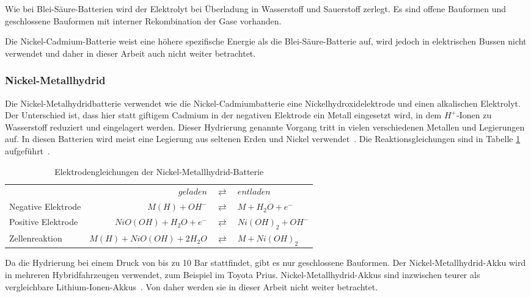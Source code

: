 Wie bei Blei-Säure-Batterien wird der Elektrolyt bei Überladung in Wasserstoff und Sauerstoff zerlegt. Es sind offene Bauformen und geschlossene Bauformen mit interner Rekombination der Gase vorhanden.

Die Nickel-Cadmium-Batterie weist eine höhere spezifische Energie als die Blei-Säure-Batterie auf, wird jedoch in elektrischen Bussen nicht verwendet und daher in dieser Arbeit auch nicht weiter betrachtet.

\subsubsection{Nickel-Metallhydrid}
Die Nickel-Metalhydridbatterie verwendet wie die Nickel-Cadmiumbatterie eine Nickelhydroxidelektrode und einen alkalischen Elektrolyt. Der Unterschied ist, dass hier statt giftigem Cadmium in der negativen Elektrode ein Metall eingesetzt wird, in dem $H^+$-Ionen zu Wasserstoff reduziert und eingelagert werden. Dieser Hydrierung genannte Vorgang tritt in vielen verschiedenen Metallen und Legierungen auf. In diesen Batterien wird meist eine Legierung aus seltenen Erden und Nickel verwendet~\cite[S. 85ff]{KiehneBattery}. Die Reaktionsgleichungen sind in Tabelle \ref{NiMH} aufgeführt~\cite[S. 245]{Sterner:2014}.

\begin{table}\centering
	\begin{tabularx}{\linewidth}{XrcX}
		\toprule
		&              $geladen$ & $\rightleftarrows$ & $entladen$        \\
		Negative Elektrode &          $M(H) + OH^-$ & $\rightleftarrows$ & $M + H_2O + e^-$  \\
		Positive Elektrode &   $NiO(OH) + H_2O + e^-$ & $\rightleftarrows$ & $Ni(OH)_2 + OH^-$ \\ \midrule
		Zellenreaktion     & $M(H) + NiO(OH) + 2H_2O$ & $\rightleftarrows$ & $M + Ni(OH)_2$    \\ \bottomrule
	\end{tabularx}
	\caption{Elektrodengleichungen der Nickel-Metallhydrid-Batterie}
	\label{NiMH}
\end{table}

Da die Hydrierung bei einem Druck von bis zu 10 Bar stattfindet, gibt es nur geschlossene Bauformen. Der Nickel-Metallhydrid-Akku wird in mehreren Hybridfahrzeugen verwendet, zum Beispiel im Toyota Prius. Nickel-Metallhydrid-Akkus sind inzwischen teurer als vergleichbare Lithium-Ionen-Akkus~\cite[S. 33]{Schimke:2012}. Von daher werden sie in dieser Arbeit nicht weiter betrachtet.

